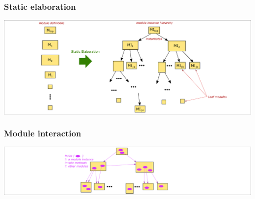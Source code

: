 \begin{frame}
\frametitle{Static elaboration}

\begin{center}
\includegraphics[width=\textwidth]{../Figures/Fig_BSV_static_elaboration}
\end{center}

\end{frame}


\begin{frame}
\frametitle{Module interaction}

\begin{center}
\includegraphics[width=\textwidth]{../Figures/Fig_BSV_module_interaction}
\end{center}

\end{frame}






